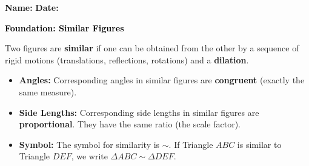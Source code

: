 \documentclass[12pt, letterpaper, fleqn]{article}
\begin{document}
\textbf{Name:} \underline{\hspace{5cm}}
\hfill
\textbf{Date:} \underline{\hspace{3cm}}\\

\begin{tcolorbox}[colback=customteal!20]
    \large\textcolor{black}{\textbf{Foundation: Similar Figures}}
\end{tcolorbox}

\vspace{3mm}

\noindent
Two figures are \textbf{similar} if one can be obtained from the other by a sequence of rigid motions (translations, reflections, rotations) and a \textbf{dilation}.

\begin{itemize}
    \item \textbf{Angles:} Corresponding angles in similar figures are \textbf{congruent} (exactly the same measure).
    \item \textbf{Side Lengths:} Corresponding side lengths in similar figures are \textbf{proportional}. They have the same ratio (the scale factor).
    \item \textbf{Symbol:} The symbol for similarity is $\sim$. If Triangle $ABC$ is similar to Triangle $DEF$, we write $\Delta ABC \sim \Delta DEF$.
\end{itemize}

\vspace{4mm}
\end{document}
